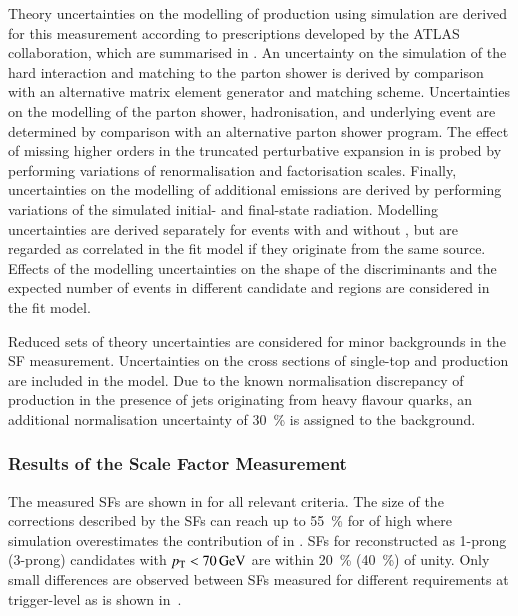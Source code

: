 Theory uncertainties on the modelling of \ttbar production using simulation are
derived for this measurement according to prescriptions developed by the ATLAS
collaboration, which are summarised in . An
uncertainty on the simulation of the hard interaction and matching to the parton
shower is derived by comparison with an alternative matrix element generator and
matching scheme. Uncertainties on the modelling of the parton shower,
hadronisation, and underlying event are determined by comparison with an
alternative parton shower program. The effect of missing higher orders in the
truncated perturbative expansion in \alphas is probed by performing variations
of renormalisation and factorisation scales. Finally, uncertainties on the
modelling of additional emissions are derived by performing variations of the
simulated initial- and final-state radiation. Modelling uncertainties are
derived separately for \ttbar events with and without \faketauhadvis, but are
regarded as correlated in the fit model if they originate from the same
source. Effects of the \ttbar modelling uncertainties on the shape of the \mTW
discriminants and the expected number of events in different \tauhadvis
candidate \Ntracks and \pT regions are considered in the fit model.

Reduced sets of theory uncertainties are considered for minor backgrounds in the
SF measurement. Uncertainties on the cross sections of single-top and \Vjets
production are included in the model. Due to the known normalisation discrepancy
of \Vjets production in the presence of jets originating from heavy flavour
quarks, an additional normalisation uncertainty of \SI{30}{\percent} is assigned
to the \Vjets background.


\subsubsection{Results of the Scale Factor Measurement}

The measured \faketauhadvis SFs are shown in  for
all relevant \tauid criteria. The size of the corrections described by the SFs
can reach up to \SI{55}{\percent} for \faketauhadvis of high \pT where
simulation overestimates the contribution of \faketauhadvis in \ttbar. SFs for
\faketauhadvis reconstructed as 1-prong (3-prong) candidates with
$\pT < \SI{70}{\GeV}$ are within \SI{20}{\percent} (\SI{40}{\percent}) of
unity. Only small differences are observed between SFs measured for different
\tauid requirements at trigger-level as is shown
in~.

